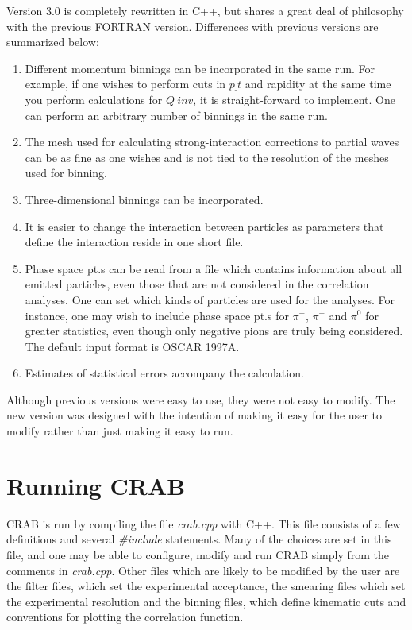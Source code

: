 \documentclass[11pt]{article}
\begin{document}
Version 3.0 is completely rewritten in C++, but shares a great deal of
philosophy with the previous FORTRAN version. Differences with previous
versions are summarized below:
\begin{enumerate}
\item Different momentum binnings can be incorporated in the same run. For
example, if one wishes to perform cuts in $p\underline ~t$ and rapidity at the
same time you perform calculations for $Q\underline ~{inv}$, it is
straight-forward to implement. One can perform an arbitrary number of binnings
in the same run.
\item The mesh used for calculating strong-interaction corrections to partial
waves can be as fine as one wishes and is not tied to the resolution of the
meshes used for binning.
\item Three-dimensional binnings can be incorporated.
\item It is easier to change the interaction between particles as parameters
that define the interaction reside in one short file.
\item Phase space pt.s can be read from a file which contains information about
all emitted particles, even those that are not considered in the correlation
analyses. One can set which kinds of particles are used for the analyses. For
instance, one may wish to include phase space pt.s for $\pi^+$, $\pi^-$ and
$\pi^0$ for greater statistics, even though only negative pions are truly being
considered. The default input format is OSCAR 1997A.
\item Estimates of statistical errors accompany the calculation.
\end{enumerate}

Although previous versions were easy to use, they were not easy to modify. The
new version was designed with the intention of making it easy for the user to
modify rather than just making it easy to run.


\section{Running CRAB}

CRAB is run by compiling the file {\it crab.cpp} with C++. This file consists
of a few definitions and several {\it \#include} statements. Many of the
choices are set in this file, and one may be able to configure, modify and run
CRAB simply from the comments in {\it crab.cpp}. Other files which are
likely to be modified by the user are the filter files, which set the
experimental acceptance, the smearing files which set the experimental
resolution and the binning files, which define kinematic cuts and conventions
for plotting the correlation function.
\end{document}
